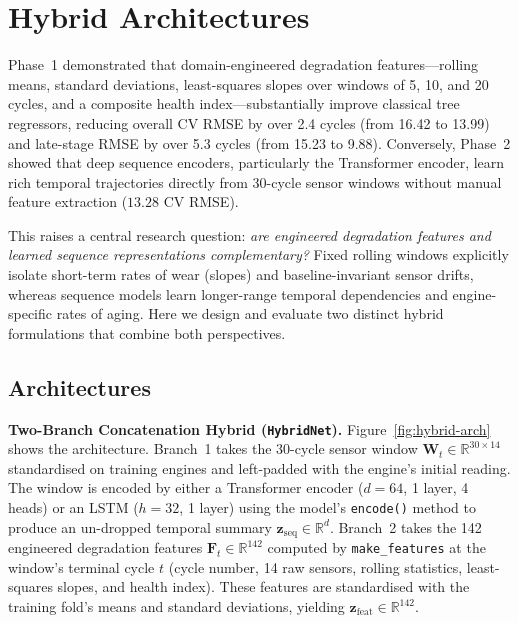 \section{Hybrid Architectures}
\label{sec:hybrid}

Phase~1 demonstrated that domain-engineered degradation features---rolling means,
standard deviations, least-squares slopes over windows of 5, 10, and 20 cycles,
and a composite health index---substantially improve classical tree regressors,
reducing overall CV RMSE by over 2.4 cycles (from 16.42 to 13.99) and late-stage
RMSE by over 5.3 cycles (from 15.23 to 9.88). Conversely, Phase~2 showed that
deep sequence encoders, particularly the Transformer encoder, learn rich temporal
trajectories directly from 30-cycle sensor windows without manual feature
extraction ($13.28$ CV RMSE).

This raises a central research question: \emph{are engineered degradation
features and learned sequence representations complementary?} Fixed rolling
windows explicitly isolate short-term rates of wear (slopes) and baseline-invariant
sensor drifts, whereas sequence models learn longer-range temporal dependencies and
engine-specific rates of aging. Here we design and evaluate two distinct hybrid
formulations that combine both perspectives.

\subsection{Architectures}

\textbf{Two-Branch Concatenation Hybrid (\texttt{HybridNet}).}
Figure~\ref{fig:hybrid-arch} shows the architecture.
Branch~1 takes the 30-cycle sensor window $\mathbf{W}_t \in \mathbb{R}^{30 \times 14}$
standardised on training engines and left-padded with the engine's initial reading.
The window is encoded by either a Transformer encoder ($d=64$, 1 layer, 4 heads)
or an LSTM ($h=32$, 1 layer) using the model's \texttt{encode()} method to produce
an un-dropped temporal summary $\mathbf{z}_{\mathrm{seq}} \in \mathbb{R}^d$.
Branch~2 takes the 142 engineered degradation features $\mathbf{F}_t \in \mathbb{R}^{142}$
computed by \texttt{make\_features} at the window's terminal cycle $t$ (cycle number,
14 raw sensors, rolling statistics, least-squares slopes, and health index).
These features are standardised with the training fold's means and standard deviations,
yielding $\mathbf{z}_{\mathrm{feat}} \in \mathbb{R}^{142}$.

